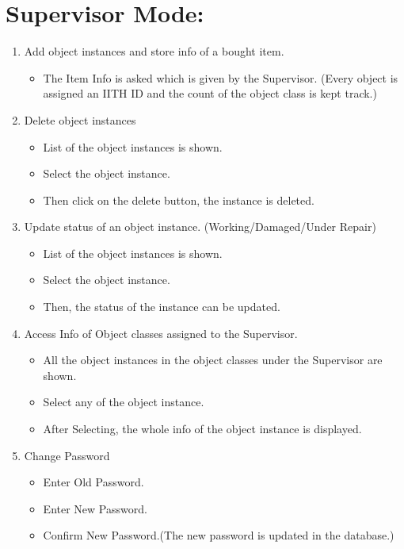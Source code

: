 \documentclass[12pt,a4paper]{article}
\begin{document}
    \newpage
    
    \section{Supervisor Mode:}
    \begin{enumerate}
    \item Add object instances and store info of a bought item.
    \begin{itemize}
    \item The Item Info is asked which is given by the Supervisor. (Every object is assigned an IITH ID and the count of the object class is kept track.) 
    \end{itemize}
    
    \item Delete object instances
    \begin{itemize}
	\item List of the object instances is shown.
	\item Select the object instance.
	\item Then click on the delete button, the instance is deleted.
	\end{itemize}
	
	\item Update status of an object instance. (Working/Damaged/Under Repair)			
	\begin{itemize}
	\item List of the object instances is shown.
	\item Select the object instance.
	\item Then, the status of the instance can be updated.
	\end{itemize}
	
	\item Access Info of Object classes assigned to the Supervisor.
	\begin{itemize}
	\item All the object instances in the object classes under the  Supervisor are shown.
	\item Select any of the object instance.
	\item After Selecting, the whole info of the object instance is displayed.
	\end{itemize}
	
	\item Change Password
    \begin{itemize}
    \item Enter Old Password.
    \item Enter New Password.
    \item Confirm New Password.(The new password is updated in the database.)
    \end{itemize}
    \end{enumerate}
    
\end{document}
